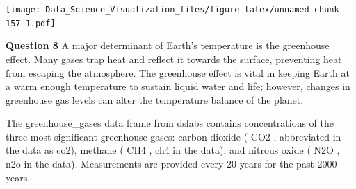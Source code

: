 \documentclass[
]{article}
\newenvironment{Shaded}{\begin{snugshade}}{\end{snugshade}}
\newcommand{\DataTypeTok}[1]{\textcolor[rgb]{0.13,0.29,0.53}{#1}}
\newcommand{\DecValTok}[1]{\textcolor[rgb]{0.00,0.00,0.81}{#1}}
\newcommand{\FloatTok}[1]{\textcolor[rgb]{0.00,0.00,0.81}{#1}}
\newcommand{\KeywordTok}[1]{\textcolor[rgb]{0.13,0.29,0.53}{\textbf{#1}}}
\newcommand{\NormalTok}[1]{#1}
\newcommand{\OperatorTok}[1]{\textcolor[rgb]{0.81,0.36,0.00}{\textbf{#1}}}
\newcommand{\StringTok}[1]{\textcolor[rgb]{0.31,0.60,0.02}{#1}}
\begin{document}
\begin{Shaded}
\end{Shaded}

\texttt{[image: Data\_Science\_Visualization\_files/figure-latex/unnamed-chunk-157-1.pdf]}

\textbf{Question 8} A major determinant of Earth's temperature is the
greenhouse effect. Many gases trap heat and reflect it towards the
surface, preventing heat from escaping the atmosphere. The greenhouse
effect is vital in keeping Earth at a warm enough temperature to sustain
liquid water and life; however, changes in greenhouse gas levels can
alter the temperature balance of the planet.

The greenhouse\_gases data frame from dslabs contains concentrations of
the three most significant greenhouse gases: carbon dioxide ( CO2 ,
abbreviated in the data as co2), methane ( CH4 , ch4 in the data), and
nitrous oxide ( N2O , n2o in the data). Measurements are provided every
20 years for the past 2000 years.
\end{document}
